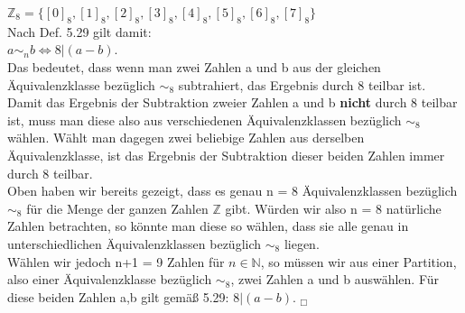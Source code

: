 \documentclass[11pt,a4paper]{article}
\begin{document}
$\mathbb{Z}_8 = \{[0]_8, [1]_8, [2]_8, [3]_8, [4]_8, [5]_8, [6]_8, [7]_8\}$ \\

Nach Def. 5.29 gilt damit: \\

$a \sim_n b \Leftrightarrow 8 | (a-b)$. \\

Das bedeutet, dass wenn man zwei Zahlen a und b aus der gleichen Äquivalenzklasse bezüglich $\sim_8$ subtrahiert, das Ergebnis durch 8 teilbar ist. Damit das Ergebnis der Subtraktion zweier Zahlen a und b \textbf{nicht} durch 8 teilbar ist, muss man diese also aus verschiedenen Äquivalenzklassen bezüglich $\sim_8$ wählen. Wählt man dagegen zwei beliebige Zahlen aus derselben Äquivalenzklasse, ist das Ergebnis der Subtraktion dieser beiden Zahlen immer durch 8 teilbar. \\

Oben haben wir bereits gezeigt, dass es genau n = 8 Äquivalenzklassen bezüglich $\sim_8$ für die Menge der ganzen Zahlen $\mathbb{Z}$ gibt. Würden wir also n = 8 natürliche Zahlen betrachten, so könnte man diese so wählen, dass sie alle genau in unterschiedlichen Äquivalenzklassen bezüglich $\sim_8$ liegen. \\
Wählen wir jedoch n+1 = 9 Zahlen für $n \in \mathbb{N}$, so müssen wir aus einer Partition, also einer Äquivalenzklasse bezüglich $\sim_8$, zwei Zahlen a und b auswählen. Für diese beiden Zahlen a,b gilt gemäß 5.29: $8 | (a-b)$.    $_\Box$


\end{document}
